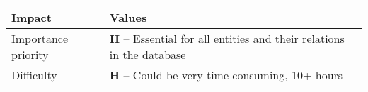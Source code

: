 \begin{itemize}
        \begin{tabular}{| l | p{7cm} |}
            \hline
            \rowcolor[gray]{0.8}
            \textbf{Impact} & \textbf{Values} \\
            \hline
            Importance priority & \textbf{H} -- Essential for all entities and their relations in the database \\
            Difficulty & \textbf{H} -- Could be very time consuming, 10+ hours \\
            \hline
        \end{tabular}
    \vspace{0.5cm}
\end{itemize}

